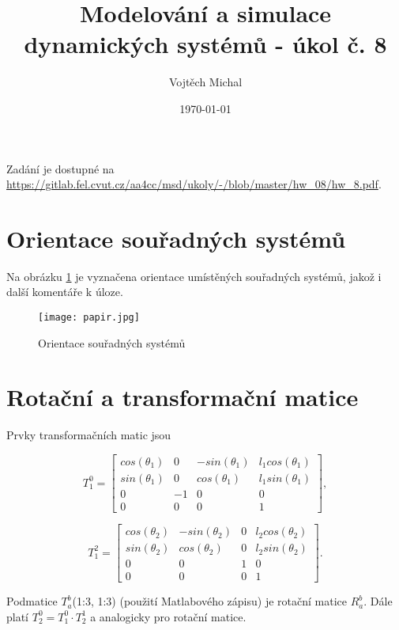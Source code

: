 \documentclass[twoside]{article}
\title{Modelování a simulace dynamických systémů - úkol č. 8}
\author{Vojtěch Michal}
\date{\today}
\begin{document}
\maketitle

Zadání je dostupné na \url{https://gitlab.fel.cvut.cz/aa4cc/msd/ukoly/-/blob/master/hw_08/hw_8.pdf}. \\

\section{Orientace souřadných systémů}
Na obrázku \ref{fig:papir} je vyznačena orientace umístěných souřadných systémů, jakož i další komentáře k úloze.

\begin{figure}[htbp]
	\centering
	\texttt{[image: papir.jpg]}
	\caption{Orientace souřadných systémů}
	\label{fig:papir}
\end{figure}

\section{Rotační a transformační matice}

Prvky transformačních matic jsou

\begin{equation}
	T_1^0 = \begin{bmatrix}
		cos(\theta_1) & 0 & -sin(\theta_1) & l_1 cos(\theta_1) \\
		sin(\theta_1) & 0 & cos(\theta_1) & l_1 sin(\theta_1) \\
		0 & -1 & 0 &0 \\
		0 & 0 & 0 & 1
	\end{bmatrix},
\end{equation}

\begin{equation}
	T_1^2 = \begin{bmatrix}
		cos(\theta_2) & -sin(\theta_2) & 0 & l_2 cos(\theta_2) \\
		sin(\theta_2) & cos(\theta_2) & 0 & l_2 sin(\theta_2) \\
		0 & 0 & 1 & 0 \\
		0 & 0 & 0 & 1
	\end{bmatrix}.
\end{equation}

Podmatice $T_a^b$(1:3, 1:3) (použití Matlabového zápisu) je rotační matice $R_a^b$. Dále platí $T_2^0 = T_1^0 \cdot T_2^1$ a analogicky pro rotační matice.
\end{document}

